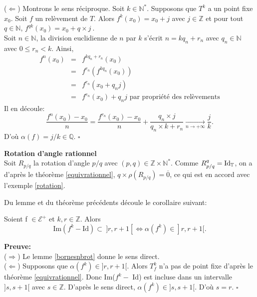 	($\Leftarrow$) Montrons le sens réciproque. Soit $k \in \mathbb{N}^*$. Supposons que $T^k$ a un point fixe $x_0$. Soit $f$ un relèvement de $T$. Alors $f^k(x_0)= x_0 + j$ avec $j \in \mathbb{Z}$ et pour tout $q \in \mathbb{N}$, $f^{qk}(x_0)=x_0 + q\times j\ $.\\
	Soit $n \in \mathbb{N}$, la division euclidienne de $n$ par $k$ s'écrit $n = k  q_n + r_n$ avec $q_n \in \mathbb{N}$ avec $0 \leq r_n < k$.
	Ainsi,
	\begin{eqnarray*}
		f^n(x_0)&=&f^{k  q_n +r_n}(x_0)\\
		&=& f^{r_n}(f^{k  q_n}(x_0))\\
		&=&f^{r_n}(x_0 + q_n j) \\
		&=& f^{r_n}(x_0) + q_n  j \text{ par propriété des relèvements}
	\end{eqnarray*}
	Il en découle:
	$$\frac{f^n(x_0) - x_0}{n}=\frac{f^{r_n}(x_0)-x_0}{n} + \frac{q_n \times j}{q_n \times k + r_n} \underset{n \to +  \infty}{\longrightarrow} \frac{j}{k}.$$
	D'où $\alpha(f)=j/k \in \mathbb{Q}$. \hfill $\square$\\


\begin{example}
	\textbf{Rotation d'angle rationnel}\\
	Soit $R_{p/q}$ la rotation d'angle $p/q$ avec $(p,q) \in \mathbb{Z} \times \mathbb{N}^*$. Comme $R_{p/q}^q= \mathrm{Id_{{\mathbb{T}}}}$, on a d'après le théorème \ref{equivrationnel}, $q \times \rho(R_{p/q})= \overline{0}$, ce qui est en accord avec l'exemple \ref{rotation}.
\end{example}

\par Du lemme et du théorème précédents découle le corollaire suivant:








\begin{corollary}\label{equiv amel}
	Soient f $\in \mathcal{E}^+$ et $k,r \in \mathbb{Z}$. Alors
	$$\mathrm{Im}(f^k - \mathrm{Id})\subset \ ]r,r+1[ \Longleftrightarrow  \alpha(f^k) \in ]r,r+1[.$$
\end{corollary}

\textbf{Preuve:}\\
($\Rightarrow$) Le lemme \ref{bornesnbrot} donne le sens direct. \\
($\Leftarrow$) Supposons que $\alpha(f^k) \in ]r,r+1[$. Alors $T_f^k$ n'a pas de point fixe d'après le théorème \ref{equivrationnel}. Donc Im($f^k -$ Id) est incluse dans un intervalle $]s,s+1[$ avec $s \in \mathbb{Z}$. D'après le sens direct, $\alpha(f^k) \in ]s,s+1[$. D'où $s=r$. \hfill $\square$\\



